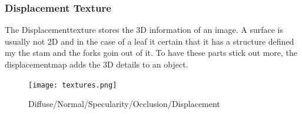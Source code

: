 \subsubsection{Displacement Texture}
The Displacementtexture stores the 3D information of an image. A surface is usually not 2D and in the case of a leaf it certain that it has a structure defined my the stam and the forks goin out of it. To have these parts stick out more, the displacementmap adds the 3D details to an object.
\begin{figure}[h]
	\centering
	\texttt{[image: textures.png]}
	\caption{Diffuse/Normal/Specularity/Occlusion/Displacement}
	\label{textures}
\end{figure}